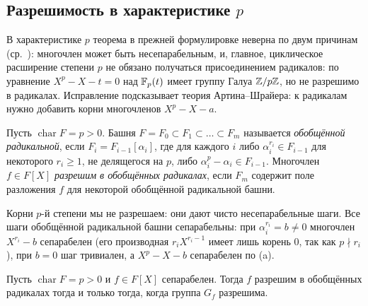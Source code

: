 \subsection*{Разрешимость в характеристике $p$}

В характеристике $p$ теорема  в прежней формулировке неверна по двум причинам (ср.\ ): многочлен может быть
несепарабельным, и, главное, циклическое расширение степени $p$ не обязано получаться присоединением радикалов: по
 уравнение $X^p-X-t=0$ над $\mathbb F_p(t)$ имеет группу Галуа $\mathbb Z/p\mathbb Z$, но не разрешимо в радикалах. Исправление
подсказывает теория Артина--Шрайера: к радикалам нужно добавить корни многочленов $X^p-X-a$.

\begin{definition}[5.35a]
Пусть $\operatorname{char}F=p>0$. Башня $F=F_0\subset F_1\subset\dots\subset F_m$ называется \emph{обобщённой радикальной},
если $F_i=F_{i-1}[\alpha_i]$, где для каждого $i$ либо $\alpha_i^{r_i}\in F_{i-1}$ для некоторого $r_i\ge1$, не делящегося на
$p$, либо $\alpha_i^p-\alpha_i\in F_{i-1}$. Многочлен $f\in F[X]$ \emph{разрешим в обобщённых радикалах}, если $F_m$ содержит
поле разложения $f$ для некоторой обобщённой радикальной башни.
\end{definition}

Корни $p$-й степени мы не разрешаем: они дают чисто несепарабельные шаги. Все шаги обобщённой радикальной башни
сепарабельны: при $\alpha_i^{r_i}=b\ne0$ многочлен $X^{r_i}-b$ сепарабелен (его производная $r_iX^{r_i-1}$ имеет лишь корень
$0$, так как $p\nmid r_i$), при $b=0$ шаг тривиален, а $X^p-X-b$ сепарабелен по (a).

\begin{theorem}
Пусть $\operatorname{char}F=p>0$ и $f\in F[X]$ сепарабелен. Тогда $f$ разрешим в обобщённых радикалах тогда и только
тогда, когда группа $G_f$ разрешима.
\end{theorem}

